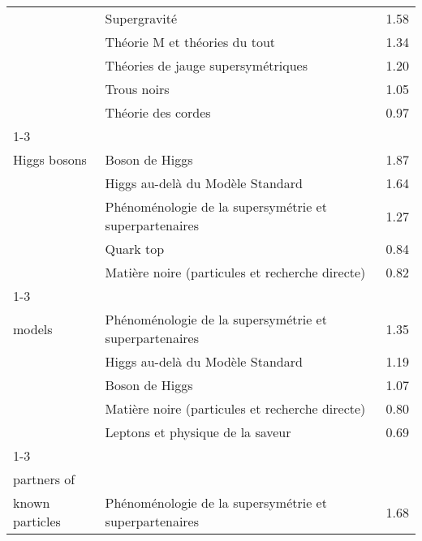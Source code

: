 \begin{longtable}[H]{p{}|p{}|p{}}
\bottomrule
\endlastfoot
\multirow{5}{*}{\begin{tabular}{l}Supergravity\end{tabular}} & Supergravité &  1.58 \\
                                             & Théorie M et théories du tout &  1.34 \\
                                             & Théories de jauge supersymétriques &  1.20 \\
                                             & Trous noirs &  1.05 \\
                                             & Théorie des cordes &  0.97 \\
\cline{1-3}
\multirow{5}{*}{\begin{tabular}{l}Supersymmetric\\ Higgs bosons\end{tabular}} & Boson de Higgs &  1.87 \\
                                             & Higgs au-delà du Modèle Standard &  1.64 \\
                                             & Phénoménologie de la supersymétrie et superpartenaires &  1.27 \\
                                             & Quark top &  0.84 \\
                                             & Matière noire (particules et recherche directe) &  0.82 \\
\cline{1-3}
\multirow{5}{*}{\begin{tabular}{l}Supersymmetric\\ models\end{tabular}} & Phénoménologie de la supersymétrie et superpartenaires &  1.35 \\
                                             & Higgs au-delà du Modèle Standard &  1.19 \\
                                             & Boson de Higgs &  1.07 \\
                                             & Matière noire (particules et recherche directe) &  0.80 \\
                                             & Leptons et physique de la saveur &  0.69 \\
\cline{1-3}
\multirow{5}{*}{\begin{tabular}{l}Supersymmetric\\ partners of\\ known particles\end{tabular}} & Phénoménologie de la supersymétrie et superpartenaires &  1.68 \\

\end{longtable}
